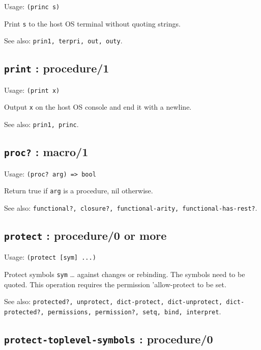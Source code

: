 \documentclass[
]{article}
\newcommand{\passthrough}[1]{#1}
\begin{document}
Usage: \passthrough{\lstinline!(princ s)!}

Print \passthrough{\lstinline!s!} to the host OS terminal without
quoting strings.

See also: \passthrough{\lstinline!prin1, terpri, out, outy!}.

\hypertarget{print-procedure1-1}{%
\subsection{\texorpdfstring{\texttt{print} :
procedure/1}{print : procedure/1}}\label{print-procedure1-1}}

Usage: \passthrough{\lstinline!(print x)!}

Output \passthrough{\lstinline!x!} on the host OS console and end it
with a newline.

See also: \passthrough{\lstinline!prin1, princ!}.

\hypertarget{proc-macro1-1}{%
\subsection{\texorpdfstring{\texttt{proc?} :
macro/1}{proc? : macro/1}}\label{proc-macro1-1}}

Usage: \passthrough{\lstinline!(proc? arg) => bool!}

Return true if \passthrough{\lstinline!arg!} is a procedure, nil
otherwise.

See also:
\passthrough{\lstinline!functional?, closure?, functional-arity, functional-has-rest?!}.

\hypertarget{protect-procedure0-or-more-1}{%
\subsection{\texorpdfstring{\texttt{protect} : procedure/0 or
more}{protect : procedure/0 or more}}\label{protect-procedure0-or-more-1}}

Usage: \passthrough{\lstinline!(protect [sym] ...)!}

Protect symbols \passthrough{\lstinline!sym!} \ldots{} against changes
or rebinding. The symbols need to be quoted. This operation requires the
permission 'allow-protect to be set.

See also:
\passthrough{\lstinline!protected?, unprotect, dict-protect, dict-unprotect, dict-protected?, permissions, permission?, setq, bind, interpret!}.

\hypertarget{protect-toplevel-symbols-procedure0-1}{%
\subsection{\texorpdfstring{\texttt{protect-toplevel-symbols} :
procedure/0}{protect-toplevel-symbols : procedure/0}}\label{protect-toplevel-symbols-procedure0-1}}
\end{document}
